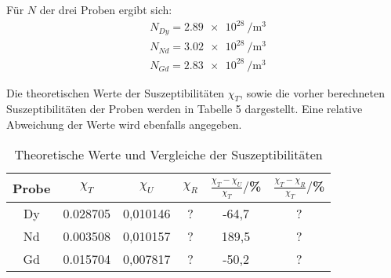 Für $N$ der drei Proben ergibt sich:
\begin{align*}
  &N_{Dy} = \SI{2.89e28}{\per\meter^3} \\
  &N_{Nd} = \SI{3.02e28}{\per\meter^3} \\
  &N_{Gd} = \SI{2.83e28}{\per\meter^3}
\end{align*}

Die theoretischen Werte der Suszeptibilitäten $\chi_T$, sowie die vorher berechneten Suszeptibilitäten
der Proben werden in Tabelle 5 dargestellt. Eine relative Abweichung der Werte wird ebenfalls angegeben.

\begin{table}[H]
  \centering
  \caption{Theoretische Werte und Vergleiche der Suszeptibilitäten}
  \label{tab:Dy}
  \begin{tabular}{c c c c c c}
    \toprule
    Probe & $\chi_T$ & $\chi_U$ & $\chi_R$ & $\frac{\chi_T - \chi_U}{\chi_T}/$\%  & $\frac{\chi_T - \chi_R}{\chi_T}/$\% \\
    \midrule
    Dy & 0.028705 & 0,010146& ? & -64,7 & ?\\
    Nd & 0.003508 & 0,010157& ? & 189,5 & ?\\
    Gd & 0.015704 & 0,007817& ? & -50,2 & ?\\
    \bottomrule
  \end{tabular}
\end{table}
